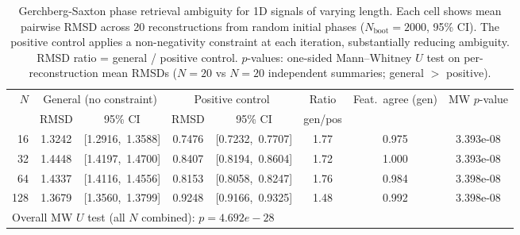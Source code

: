 \begin{table}[h]
\centering
\caption{Gerchberg-Saxton phase retrieval ambiguity for 1D signals of varying length.
Each cell shows mean pairwise RMSD across 20 reconstructions from random initial phases
($N_{\text{boot}}=2000$, 95\% CI). The positive control applies a non-negativity
constraint at each iteration, substantially reducing ambiguity.
RMSD ratio = general / positive control.
$p$-values: one-sided Mann--Whitney $U$ test on per-reconstruction mean RMSDs
($N=20$ vs $N=20$ independent summaries; general $>$ positive).}
\label{tab:phase_retrieval}
\begin{tabular}{rccccccc}
\toprule
$N$ & \multicolumn{2}{c}{General (no constraint)} & \multicolumn{2}{c}{Positive control} & Ratio & Feat.\ agree (gen) & MW $p$-value \\
    & RMSD & 95\% CI & RMSD & 95\% CI & gen/pos & & \\
\midrule
   16 & 1.3242 & [1.2916,\ 1.3588] & 0.7476 & [0.7232,\ 0.7707] & 1.77 & 0.975 & 3.393e-08 \\
   32 & 1.4448 & [1.4197,\ 1.4700] & 0.8407 & [0.8194,\ 0.8604] & 1.72 & 1.000 & 3.393e-08 \\
   64 & 1.4337 & [1.4116,\ 1.4556] & 0.8153 & [0.8058,\ 0.8247] & 1.76 & 0.984 & 3.398e-08 \\
  128 & 1.3679 & [1.3560,\ 1.3799] & 0.9248 & [0.9166,\ 0.9325] & 1.48 & 0.992 & 3.398e-08 \\
\midrule
  \multicolumn{8}{l}{Overall MW $U$ test (all $N$ combined): $p = 4.692e-28$} \\
\bottomrule
\end{tabular}
\end{table}
